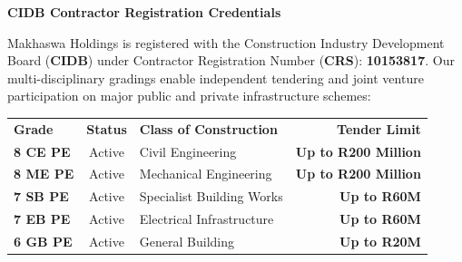 \documentclass[a4paper,11pt]{article}
\begin{document}
\noindent
\begin{minipage}[t]{0.62\textwidth}
    {\large\bfseries\color{mhnavy} CIDB Contractor Registration Credentials}
    \vspace{0.10cm}

    {\fontsize{8.8pt}{12.4pt}\selectfont\color{mhtext}
    Makhaswa Holdings is registered with the Construction Industry Development Board (\textbf{CIDB}) under Contractor Registration Number (\textbf{CRS}): \textbf{10153817}. Our multi-disciplinary gradings enable independent tendering and joint venture participation on major public and private infrastructure schemes:
    }

    \vspace{0.15cm}

    \renewcommand{\arraystretch}{1.25}
    \begin{tabularx}{\linewidth}{@{}l c p{3.6cm} r@{}}
    \rowcolor{mhnavy}
    {\color{white}\bfseries\fontsize{7.6pt}{9.2pt}\selectfont Grade} & {\color{white}\bfseries\fontsize{7.6pt}{9.2pt}\selectfont Status} & {\color{white}\bfseries\fontsize{7.6pt}{9.2pt}\selectfont Class of Construction} & {\color{white}\bfseries\fontsize{7.6pt}{9.2pt}\selectfont Tender Limit} \\
    \rowcolor{mhbluelight}
    \fontsize{7.5pt}{9.2pt}\selectfont\bfseries 8 CE PE & \fontsize{7.5pt}{9.2pt}\selectfont Active & \fontsize{7.5pt}{9.2pt}\selectfont Civil Engineering & \fontsize{7.5pt}{9.2pt}\selectfont\bfseries Up to R200 Million \\
    \fontsize{7.5pt}{9.2pt}\selectfont\bfseries 8 ME PE & \fontsize{7.5pt}{9.2pt}\selectfont Active & \fontsize{7.5pt}{9.2pt}\selectfont Mechanical Engineering & \fontsize{7.5pt}{9.2pt}\selectfont\bfseries Up to R200 Million \\
    \rowcolor{mhbluelight}
    \fontsize{7.5pt}{9.2pt}\selectfont\bfseries 7 SB PE & \fontsize{7.5pt}{9.2pt}\selectfont Active & \fontsize{7.5pt}{9.2pt}\selectfont Specialist Building Works & \fontsize{7.5pt}{9.2pt}\selectfont\bfseries Up to R60M \\
    \fontsize{7.5pt}{9.2pt}\selectfont\bfseries 7 EB PE & \fontsize{7.5pt}{9.2pt}\selectfont Active & \fontsize{7.5pt}{9.2pt}\selectfont Electrical Infrastructure & \fontsize{7.5pt}{9.2pt}\selectfont\bfseries Up to R60M \\
    \rowcolor{mhbluelight}
    \fontsize{7.5pt}{9.2pt}\selectfont\bfseries 6 GB PE & \fontsize{7.5pt}{9.2pt}\selectfont Active & \fontsize{7.5pt}{9.2pt}\selectfont General Building & \fontsize{7.5pt}{9.2pt}\selectfont\bfseries Up to R20M \\
    \end{tabularx}
    \renewcommand{\arraystretch}{1}
\end{minipage}
\end{document}
